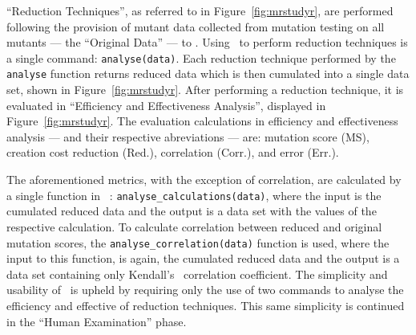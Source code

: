 ``Reduction Techniques'', as referred to in Figure~\ref{fig:mrstudyr}, are performed following the provision
of mutant data collected from mutation testing on all mutants --- the ``Original Data'' --- to \mr. Using
\mr~to perform reduction techniques is a single command: \texttt{analyse(data)}. Each reduction technique performed by
the \texttt{analyse} function returns reduced data which is then cumulated into a single data set, shown in
Figure~\ref{fig:mrstudyr}. After performing a reduction technique, it is evaluated in ``Efficiency and Effectiveness
Analysis'', displayed in Figure~\ref{fig:mrstudyr}.
The evaluation calculations in efficiency and effectiveness analysis --- and their respective abreviations --- are: mutation score
(MS), creation cost reduction (Red.), correlation (Corr.), and error (Err.).


The aforementioned metrics, with the exception of correlation, are calculated by a single function in \mr~:
\texttt{analyse\_calculations(data)}, where the input is the cumulated reduced data and the output is a data set with the
values of the respective calculation. To calculate correlation between reduced and original mutation scores, the
\texttt{analyse\_correlation(data)} function is used, where the input to this function, is again, the cumulated reduced data
and the output is a data set containing only Kendall's \taub~correlation coefficient. The simplicity and usability of \mr~is
upheld by requiring only the use of two commands to analyse the efficiency and effective of reduction techniques. This same
simplicity is continued in the ``Human Examination'' phase.


